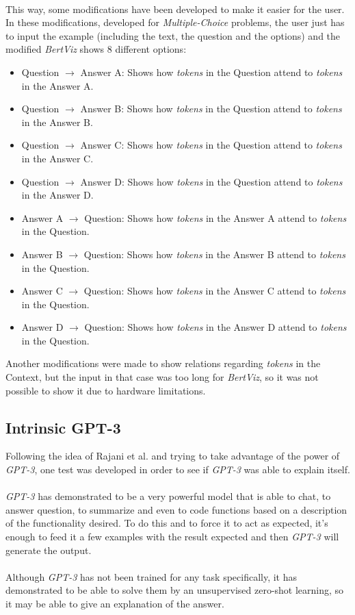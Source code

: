 \paragraph{}
This way, some modifications have been developed to make it easier for the user. In these modifications, developed for \emph{Multiple-Choice} problems, the user just has to input the example (including the text, the question and the options) and the modified \emph{BertViz} shows 8 different options:
\begin{itemize}
	\item Question $\rightarrow$ Answer A: Shows how \emph{tokens} in the Question attend to \emph{tokens} in the Answer A.
	\item Question $\rightarrow$ Answer B: Shows how \emph{tokens} in the Question attend to \emph{tokens} in the Answer B.
	\item Question $\rightarrow$ Answer C: Shows how \emph{tokens} in the Question attend to \emph{tokens} in the Answer C.
	\item Question $\rightarrow$ Answer D: Shows how \emph{tokens} in the Question attend to \emph{tokens} in the Answer D.
	\item Answer A $\rightarrow$ Question: Shows how \emph{tokens} in the Answer A attend to \emph{tokens} in the Question.
	\item Answer B $\rightarrow$ Question: Shows how \emph{tokens} in the Answer B attend to \emph{tokens} in the Question.
	\item Answer C $\rightarrow$ Question: Shows how \emph{tokens} in the Answer C attend to \emph{tokens} in the Question.
	\item Answer D $\rightarrow$ Question: Shows how \emph{tokens} in the Answer D attend to \emph{tokens} in the Question.
\end{itemize}
Another modifications were made to show relations regarding \emph{tokens} in the Context, but the input in that case was too long for \emph{BertViz}, so it was not possible to show it due to hardware limitations.

\subsection{Intrinsic GPT-3}
\label{sec:gpt3}
\noindent Following the idea of Rajani et al. \cite{Rajani2019} and trying to take advantage of the power of \emph{GPT-3}, one test was developed in order to see if \emph{GPT-3} was able to explain itself. 
\paragraph{}
\emph{GPT-3} has demonstrated to be a very powerful model that is able to chat, to answer question, to summarize and even to code functions based on a description of the functionality desired. To do this and to force it to act as expected, it's enough to feed it a few examples with the result expected and then \emph{GPT-3} will generate the output.
\paragraph{}
Although \emph{GPT-3} has not been trained for any task specifically, it has demonstrated to be able to solve them by an unsupervised zero-shot learning, so it may be able to give an explanation of the answer. 